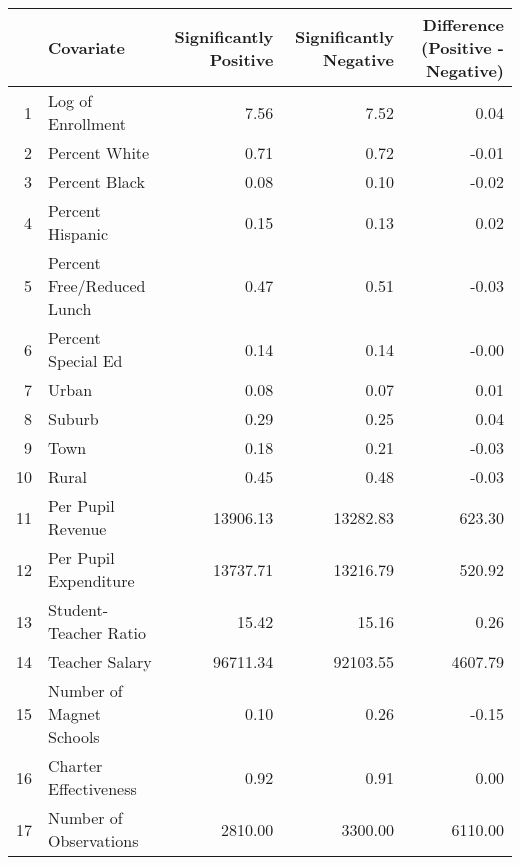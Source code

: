 \begin{tabular}{rlrrr}
  \hline
 & Covariate & Significantly Positive & Significantly Negative & Difference (Positive - Negative) \\ 
  \hline
1 & Log of Enrollment & 7.56 & 7.52 & 0.04 \\ 
  2 & Percent White & 0.71 & 0.72 & -0.01 \\ 
  3 & Percent Black & 0.08 & 0.10 & -0.02 \\ 
  4 & Percent Hispanic & 0.15 & 0.13 & 0.02 \\ 
  5 & Percent Free/Reduced Lunch & 0.47 & 0.51 & -0.03 \\ 
  6 & Percent Special Ed & 0.14 & 0.14 & -0.00 \\ 
  7 & Urban & 0.08 & 0.07 & 0.01 \\ 
  8 & Suburb & 0.29 & 0.25 & 0.04 \\ 
  9 & Town & 0.18 & 0.21 & -0.03 \\ 
  10 & Rural & 0.45 & 0.48 & -0.03 \\ 
  11 & Per Pupil Revenue & 13906.13 & 13282.83 & 623.30 \\ 
  12 & Per Pupil Expenditure & 13737.71 & 13216.79 & 520.92 \\ 
  13 & Student-Teacher Ratio & 15.42 & 15.16 & 0.26 \\ 
  14 & Teacher Salary & 96711.34 & 92103.55 & 4607.79 \\ 
  15 & Number of Magnet Schools & 0.10 & 0.26 & -0.15 \\ 
  16 & Charter Effectiveness & 0.92 & 0.91 & 0.00 \\ 
  17 & Number of Observations & 2810.00 & 3300.00 & 6110.00 \\ 
   \hline
\end{tabular}
